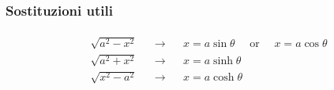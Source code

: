 \documentclass[letterpaper,10pt,italian]{jupyterBook}
\begin{document}
\subsubsection{Sostituzioni utili}
\label{\detokenize{ch/infinitesimal_calculus/integrals:sostituzioni-utili}}
\sphinxAtStartPar
{}
\begin{equation*}
\begin{split}\begin{aligned}
  & \sqrt{a^2 - x^2} && \rightarrow && x = a \sin  \theta \quad \text{ or } \quad x = a \cos \theta  \\
  & \sqrt{a^2 + x^2} && \rightarrow && x = a \sinh \theta \\
  & \sqrt{x^2 - a^2} && \rightarrow && x = a \cosh \theta \\
\end{aligned}\end{split}
\end{equation*}\label{ch/infinitesimal_calculus/integrals:example-7}
\end{document}
